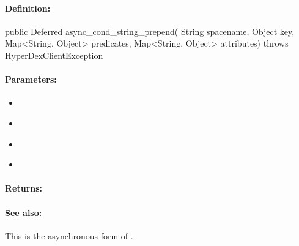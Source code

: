 \paragraph{Definition:}
\begin{javacode}
public Deferred async_cond_string_prepend(
        String spacename,
        Object key,
        Map<String, Object> predicates,
        Map<String, Object> attributes) throws HyperDexClientException
\end{javacode}

\paragraph{Parameters:}
\begin{itemize}[noitemsep]
\item {}\\

\item {}\\

\item {}\\

\item {}\\

\end{itemize}

\paragraph{Returns:}


\paragraph{See also:}  This is the asynchronous form of .

\pagebreak
\subsubsection{}
\label{api:java:group_string_append}



